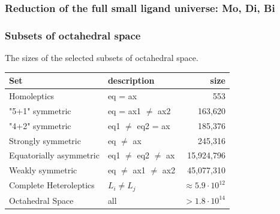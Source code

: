 \documentclass[xcolor=dvipsnames]{beamer}
\newcommand*\circled[1]{\tikz[baseline=(char.base)]{
		\node[shape=circle,draw,inner sep=2pt] (char) {#1};}}
\begin{document}
\begin{frame}
\frametitle{Reduction of the full small ligand universe: Mo, Di, Bi}

\end{frame}



\begin{frame}
\frametitle{Subsets of octahedral space}
The sizes of the selected subsets of octahedral space.
\begin{table}[]
	\centering
	\label{tab:space-sizes}
	\begin{tabular}{llr}
		\toprule
		Set 					& description		    	   & size \\
		\midrule
		Homoleptics             & eq = ax                   & 553        \\[0.1cm]
		"5+1" symmetric         & eq = ax1 $\neq$ ax2       & 163,620    \\[0.1cm]
		"4+2" symmetric         & eq1 $\neq$ eq2 = ax       & 185,376    \\[0.1cm]
		Strongly symmetric      & eq $\neq$ ax              & 245,316    \\[0.1cm]
		Equatorially asymmetric & eq1 $\neq$ eq2 $\neq$ ax  & 15,924,796 \\[0.1cm]
		Weakly symmetric        & eq $\neq$ ax1 $\neq$ ax2  & 45,077,310 \\[0.1cm]
		Complete Heteroleptics  & $L_i \neq L_j$            & $\approx 5.9 \cdot 10^{12}$ \\[0.1cm] %
		Octahedral Space        & all                       & $> 1.8 \cdot 10^{14}$ \\
		\bottomrule
	\end{tabular}
	\end{table}
\end{frame}
\end{document}
